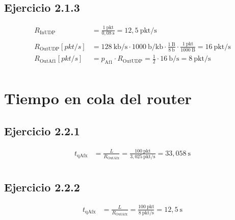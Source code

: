 \vspace{0,3cm}

\subsection{Ejercicio 2.1.3}
\[
    \label{eq:udp_tasas_sin_VoIP}
    \begin{aligned}
        R_{\text{InUDP}} &= \frac{1~\text{pkt}}{0,08~\text{s}} = 12,5~\text{pkt/s} \\ \\
        R_{\text{OutUDP}}[pkt/s] &= 128~\text{kb/s} \cdot 1000~\text{b/kb} \cdot \frac{1~\text{B}}{8~\text{b}} \cdot \frac{1~\text{pkt}}{1000~\text{B}} = 16~\text{pkt/s} \\
		R_{\text{OutAf1}}[pkt/s] &= p_{\text{Af1}} \cdot R_{\text{OutUDP}} = \frac{1}{2} \cdot 16~\text{b/s} = 8~\text{pkt/s} \\
    \end{aligned}
\]

\vspace{1cm}

\section{Tiempo en cola del router}

\subsection{Ejercicio 2.2.1}
\[
    \label{eq:udp_tiempo_en_cola_con_VoIP}
    \begin{aligned}
        t_{\text{qAfx}} &= \frac{L}{R_{\text{OutAfx}}} = \frac{100~\text{pkt}}{3,025~\text{pkt/s}}= 33,058~\text{s} \\
    \end{aligned}
\]

\vspace{0,3cm}

\subsection{Ejercicio 2.2.2}
\[
    \label{eq:udp_tiempo_en_cola_sin_VoIP}
    \begin{aligned}
        t_{\text{qAfx}} &= \frac{L}{R_{\text{OutAfx}}} = \frac{100~\text{pkt}}{8~\text{pkt/s}}= 12,5~\text{s} \\
    \end{aligned}
\]

\vspace{1cm}

